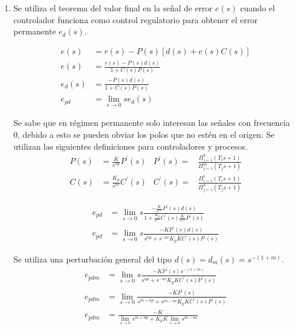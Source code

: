 

\begin{ejercicio}
  \begin{enumerate}
    \item
    Se utiliza el teorema del valor final en la señal de error $e(s)$ cuando el controlador funciona como control regulatorio para obtener el error permanente $e_d(s)$.

    \begin{align*}
      e(s) &= r(s) - P(s)\left[d(s)+e(s) C(s)\right]
      \\ \tag{Señal de error}
      e(s) &= \frac{r(s) - P(s)d(s)}{1+C(s) P(s)}
      \\ \tag{Error de control regulatorio}
      e_d(s) &= \frac{-P(s) d(s)}{1+C(s)P(s)}
      \\ \tag{Teorema del valor final}
      e_{pd} &= \lim_{s\rightarrow 0} s e_d(s)
    \end{align*}

    Se sabe que en régimen permanente solo interesan las señales con frecuencia 0, debido a esto se pueden obviar los polos que no estén en el origen. Se utilizan las siguientes definiciones para controladores y procesos.
    \begin{align*}
      P(s) &= \frac{K}{s^{np}}P^{'}(s) & P^{'}(s) =& \frac{\Pi_{i=1}^{k}(T_i s +1)}{\Pi_{j=1}^{m}(T_j s +1)}
      \\
      C(s) &= \frac{K_p}{s^{nc}}C^{'}(s) & C^{'}(s) =& \frac{\Pi_{i=1}^{l}(T_i s +1)}{\Pi_{j=1}^{n}(T_j s +1)}
    \end{align*}

    \begin{align*}
      e_{pd} &= \lim_{s\rightarrow 0} s \frac{-\frac{K}{s^{np}}P^{'}(s) d(s)}
      {1+ \frac{K_p}{s^{nc}}C^{'}(s) \frac{K}{s^{np}}P^{'}(s)}
      \\
      e_{pd} &= \lim_{s\rightarrow 0} s \frac{-K P^{'}(s) d(s)}
      {s^{np} + s^{-nc} K_p K C^{'}(s) P^{'}(s)}
    \end{align*}

    Se utiliza una perturbación general del tipo $d(s)=d_m(s)=s^{-(1+m)}$.
    \begin{align*}
      e_{pdm} &= \lim_{s\rightarrow 0} s \frac{-K P^{'}(s) s^{-(1+m)}}
      {s^{np} + s^{-nc} K_p K C^{'}(s) P^{'}(s)}
      \\
      e_{pdm} &= \lim_{s\rightarrow 0} \frac{-K P^{'}(s)}
      {s^{m+np} + s^{m-nc} K_p K C^{'}(s) P^{'}(s)}
      \\ \tag{error permanente ante perturbación general}
      e_{pdm} &= \frac{-K}
      {\lim_{s\rightarrow 0}s^{m+np} + K_p K\lim_{s\rightarrow 0} s^{m-nc}}
    \end{align*}


\end{enumerate}
\end{ejercicio}
